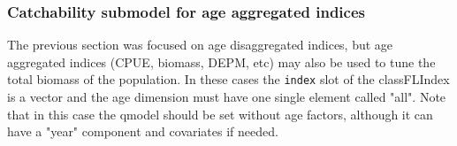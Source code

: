 \documentclass[a4paper,english,10pt]{article}\usepackage[]{graphicx}\usepackage[]{color}
\makeatletter
\newenvironment{kframe}{%
 \def\at@end@of@kframe{}%
 \ifinner\ifhmode%
  \def\at@end@of@kframe{\end{minipage}}%
  \begin{minipage}{\columnwidth}%
 \fi\fi%
 \def\FrameCommand##1{\hskip\@totalleftmargin \hskip-\fboxsep
 \colorbox{shadecolor}{##1}\hskip-\fboxsep
     \hskip-\linewidth \hskip-\@totalleftmargin \hskip\columnwidth}%
 \MakeFramed {\advance\hsize-\width
   \@totalleftmargin\z@ \linewidth\hsize
   \@setminipage}}%
 {\par\unskip\endMakeFramed%
 \at@end@of@kframe}
\newenvironment{knitrout}{}{} %
\newcommand{\code}[1]{{\texttt{#1}}}
\makeatother
\begin{document}
\begin{knitrout}
\color{fgcolor}\begin{kframe}


{\ttfamily\noindent\bfseries{}}\end{kframe}
\end{knitrout}

\subsubsection{Catchability submodel for age aggregated indices}

The previous section was focused on age disaggregated indices, but age aggregated indices (CPUE, biomass, DEPM, etc) may also be used to tune the total biomass of the population. In these cases the \code{index}  slot of the class{FLIndex} is a vector and the age dimension must have one single element called "all". Note that in this case the qmodel should be set without age factors, although it can have a "year" component and covariates if needed.
\end{document}
